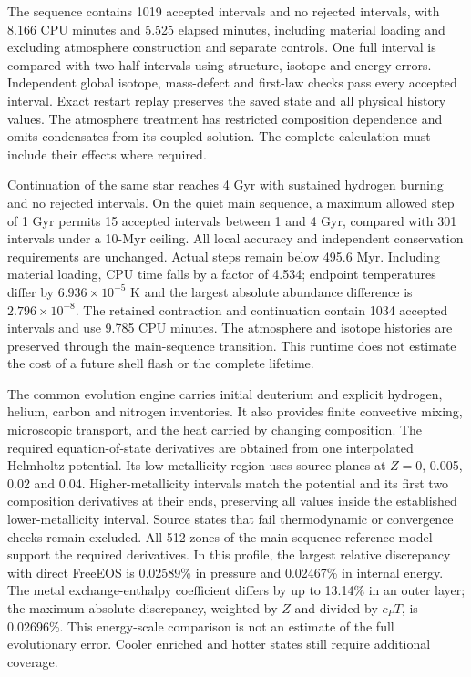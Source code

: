 \documentclass[11pt,letterpaper]{article}
\begin{document}
The sequence contains 1019 accepted intervals and no rejected intervals,
with 8.166 CPU minutes and 5.525 elapsed minutes, including material loading
and excluding atmosphere construction and separate controls. One full interval
is compared with two half intervals using structure, isotope and energy
errors. Independent global isotope, mass-defect and first-law checks pass
every accepted interval. Exact restart replay preserves the saved state and
all physical history values. The atmosphere treatment has restricted
composition dependence and omits condensates from its coupled solution.
The complete calculation must include their effects where required.

Continuation of the same star reaches 4 Gyr with sustained hydrogen burning
and no rejected intervals. On the quiet main sequence, a maximum allowed
step of 1 Gyr permits 15 accepted intervals between 1 and 4 Gyr, compared
with 301 intervals under a 10-Myr ceiling. All local accuracy and independent
conservation requirements are unchanged. Actual steps remain below
495.6 Myr. Including material loading, CPU time falls by a factor of 4.534;
endpoint temperatures differ by $6.936\times10^{-5}$ K and the largest
absolute abundance difference is $2.796\times10^{-8}$.
The retained contraction and continuation contain 1034 accepted intervals
and use 9.785 CPU minutes. The atmosphere and isotope histories are preserved
through the main-sequence transition. This runtime does not estimate the
cost of a future shell flash or the complete lifetime.

The common evolution engine carries initial deuterium and explicit
hydrogen, helium, carbon and nitrogen inventories. It also provides finite convective
mixing, microscopic transport, and the heat carried by changing composition.
The required equation-of-state derivatives are obtained from one interpolated
Helmholtz potential. Its low-metallicity region uses source planes at
$Z=0$, 0.005, 0.02 and 0.04. Higher-metallicity intervals match the potential
and its first two composition derivatives at their ends, preserving all
values inside the established lower-metallicity interval. Source states
that fail thermodynamic or convergence checks remain excluded.
All 512 zones of the main-sequence reference model support the required
derivatives. In this profile, the largest relative discrepancy with direct
FreeEOS is 0.02589\% in pressure and 0.02467\% in internal energy.
The metal exchange-enthalpy coefficient differs by up to 13.14\% in an
outer layer; the maximum absolute discrepancy, weighted by $Z$ and divided
by $c_P T$, is 0.02696\%. This energy-scale comparison is not an estimate
of the full evolutionary error. Cooler enriched and hotter states still
require additional coverage.
\end{document}
